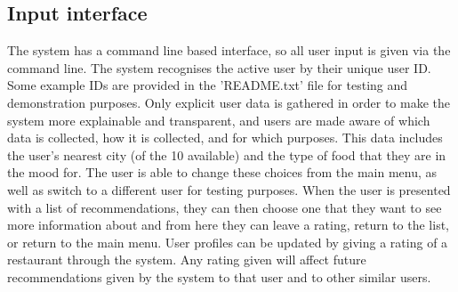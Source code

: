 \documentclass[conference]{IEEEtran}
\begin{document}
\subsection{Input interface}
The system has a command line based interface, so all user input is given via the command line. 
The system recognises the active user by their unique user ID. 
Some example IDs are provided in the 'README.txt' file for testing and demonstration purposes. 
Only explicit user data is gathered in order to make the system more explainable and transparent, 
and users are made aware of which data is collected, how it is collected, and for which purposes. 
This data includes the user's nearest city (of the 10 available) and the type of food that 
they are in the mood for. 
The user is able to change these choices from the main menu, as well as switch to a different user 
for testing purposes. 
When the user is presented with a list of recommendations, they can then choose one that they want 
to see more information about and from here they can leave a rating, return to the list, or return to 
the main menu. 
User profiles can be updated by giving a rating of a restaurant through the system. 
Any rating given will affect future recommendations given by the system to that user 
and to other similar users. 
\end{document}
